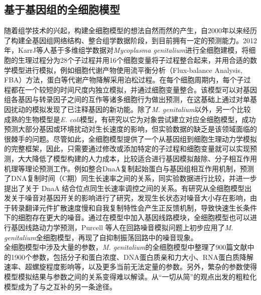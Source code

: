 \documentclass[b5paper,9pt,oneolumn,twoside,UTF8]{article}
\begin{document}
\subsection{基于基因组的全细胞模型}
随着组学技术的兴起，构建全细胞模型的想法自然而然的产生，自2000年以来经历了构建全基因组网络结构、整合组学数据阶段\cite{Tomita1999}，到目前拥有一定的预测能力。2012年，KarrJ等人基于多维组学数据对\emph{Mycoplasma genitalium}进行全细胞建模，将细胞的生理过程分为28个子过程并用16个细胞变量将子过程整合起来，并用合适的数学模型进行模拟，例如细胞代谢产物使用流平衡分析（Flux-balance Analysis, FBA）方法，蛋白等代谢产物降解采用泊松过程。在每个细胞周期内，每个子过程都在一个较短的时间尺度内独立模拟，并通过细胞变量整合。该模型可以对基因组各基因与转录因子之间的互作等诸多细胞行为做出预测，在这基础上通过对单基因扰动的模拟发现了已注释基因的新功能\cite{karr2012whole}。除了\emph{M. genitalium}以外，另一个比较成熟的生物模型是\emph{E. coli}模型，有研究以它为对象尝试建立对应全细胞模型，成功预测大部分基因或环境扰动对生长速度的影响，但实验数据的缺乏是该领域面临的很棘手的问题\cite{Carrera2014}。尽管如此，全细胞模型提供了一个从基因组到细胞生理动力学模拟的完整框架，因此，只需要通过修改或添加特定的子过程和细胞变量就可以实现预测，大大降低了模型构建的人力成本，比较适合进行基因模拟敲除、分子相互作用机理等理论预测工作。例如整合DnaA复制起始蛋白与基因组相互作用机制，预测了DNA复制时间（C期）同生长速率之间的关系，同实验数据进行比较，并进一步提出了关于 DnaA 结合位点同生长速率调控之间的关系\cite{Shuler2008}。有研究从全细胞模型出发关于噪音对基因开关的影响进行了研究，发现生长状态对噪音大小存在影响，由于转录翻译元件扩散速度慢和自我复制特性会产生正反馈机制，导致快速生长条件下的细胞存在更大的噪音\cite{Roberts2011}。通过在模型中加入基因线路模块，全细胞模型也可以进行基因线路动力学预测，Purcell 等人在回路噪音模拟问题上初步应用了\emph{M. genitalium}全细胞模型，再现了自抑制振荡回路中的噪音现象\cite{Purcell2013a}。\\
\indent 全细胞模型中涉及大量的参数，\emph{M. genitalium}的全细胞模型中整理了900篇文献中的1900个参数，包括分子和蛋白浓度、DNA蛋白质亲和力大小、RNA蛋白质降解速率、超螺旋程度影响等，以及更多当前无法定量的参数\cite{Babtie2017}。另外，繁杂的参数使得模型模拟结果与参数之间的关系变得难以解读。从“一切从简”的观点出发的粗粒化模型成为了与之互补的另一条途径。
\end{document}
